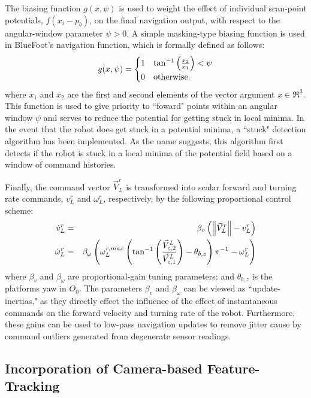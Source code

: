 The biasing function $g(x,\psi)$ is used to weight the effect of individual scan-point potentials, $f(x_{i}-p_{b})$, on the final navigation output, with respect to the angular-window parameter $\psi>0$. A simple masking-type biasing function is used in BlueFoot's navigation function, which is formally defined as follows:
	\begin{equation}
		g(x,\psi) = 
		\begin{cases}
		1	& \tan^{-1}\left( \frac{x_{2}}{x_{1}} \right) < \psi \\
		0 	& \text{otherwise}.
		\end{cases}
	\end{equation}
where $x_{1}$ and $x_{2}$ are the first and second elements of the vector argument $x\in\Re^{3}$. This function is used to give priority to ``foward" points within an angular window $\psi$ and serves to reduce the potential for getting stuck in local minima. In the event that the robot does get stuck in a potential minima, a ``stuck" detection algorithm has been implemented. As the name suggests, this algorithm first detects if the robot is stuck in a local minima of the potential field based on a window of command histories.

Finally, the command vector $\vec{V}_{L}^{r}$ is transformed into scalar forward and turning rate commands, ${v}_{L}^{r}$ and $\omega_{L}^{r}$, respectively, by the following proportional control scheme:
	\begin{eqnarray}
	\dot{v}_{L}^{r} 		&=& \beta_{v} \left( \left\lVert \vec{V}_{L}^{r} \right\rVert - v_{L}^{r} \right) \nonumber \\
	\dot{\omega}_{L}^{r} 	&=& \beta_{\omega} \left(  \omega_{L}^{r,max} \left( { \tan^{-1}\left( \frac{\vec{V}_{c,2}^{L}}{\vec{V}_{c,1}^{L}} \right) } - \theta_{b,z} \right){\pi}^{-1} - \omega_{L}^{r} \right)
	\end{eqnarray}
where $\beta_{v}$ and $\beta_{\omega}$ are proportional-gain tuning parameters; and $\theta_{b,z}$ is the platforms yaw in $O_{0}$. The parameters $\beta_{v}$ and $\beta_{\omega}$ can be viewed as ``update-inertias," as they directly effect the influence of the effect of instantaneous commands on the forward velocity and turning rate of the robot. Furthermore, these gains can be used to low-pass navigation updates to remove jitter cause by command outliers generated from degenerate sensor readings.

		\subsection{Incorporation of Camera-based Feature-Tracking}
		
